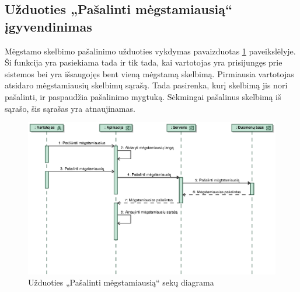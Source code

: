 \documentclass[12pt]{article}
\begin{document}
	\subsection{Užduoties „Pašalinti mėgstamiausią“ įgyvendinimas}
	Mėgstamo skelbimo pašalinimo užduoties vykdymas  pavaizduotas \ref{DelFavSeq} paveikslėlyje. Ši funkcija yra pasiekiama tada ir tik tada, kai vartotojas yra prisijungęs prie sistemos bei yra išsaugojęs bent vieną mėgstamą skelbimą. Pirmiausia vartotojas atsidaro mėgstamiausių skelbimų sąrašą. Tada pasirenka, kurį skelbimą jis nori pašalinti, ir paspaudžia pašalinimo mygtuką. Sėkmingai pašalinus skelbimą iš sąrašo, šis sąrašas yra atnaujinamas.
	\begin{figure}[h]
		\begin{center}
			\includegraphics[width=\textwidth]{PasalintiMegstamiausia.eps}
			\caption{Užduoties „Pašalinti mėgstamiausią“ sekų diagrama\label{DelFavSeq}}
		\end{center}
	\end{figure}
	
	\pagebreak
	
\end{document}
